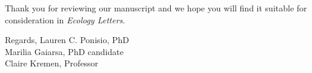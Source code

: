 \documentclass[12pt]{letter}
\begin{document}
\begin{letter}{}
  Thank you for reviewing our manuscript and we hope you will find it
  suitable for consideration in \textit{Ecology Letters}.
  
  Regards,
  Lauren C. Ponisio, PhD\\
  Marilia Gaiarsa, PhD candidate\\
  Claire Kremen, Professor

\end{letter}
\end{document}
